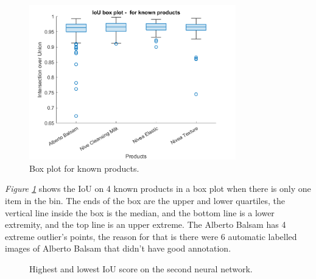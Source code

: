 \clearpage
\begin{figure}[h]
 \centering
 \includegraphics[width=0.8\textwidth]{graphics/results/v2boxplotForKnownProducts.png}
 \caption{Box plot for known products.}
 \label{fig:v2boxknownproducts}
\end{figure}
\textit{Figure \ref{fig:v2boxknownproducts}} shows the IoU on 4 known products in a box plot when there is only one item in the bin. The ends of the box are the upper and lower quartiles, the vertical line inside the box is the median, and the bottom line is a lower extremity, and the top line is an upper extreme. The Alberto Balsam has 4 extreme outlier’s points, the reason for that is there were 6 automatic labelled images of Alberto Balsam that didn’t have good annotation. 

\begin{figure}[h]
 \centering
 \hfill
 \caption{Highest and lowest IoU score on the second neural network.}
 \label{figure: v2bestworst}
\end{figure}

